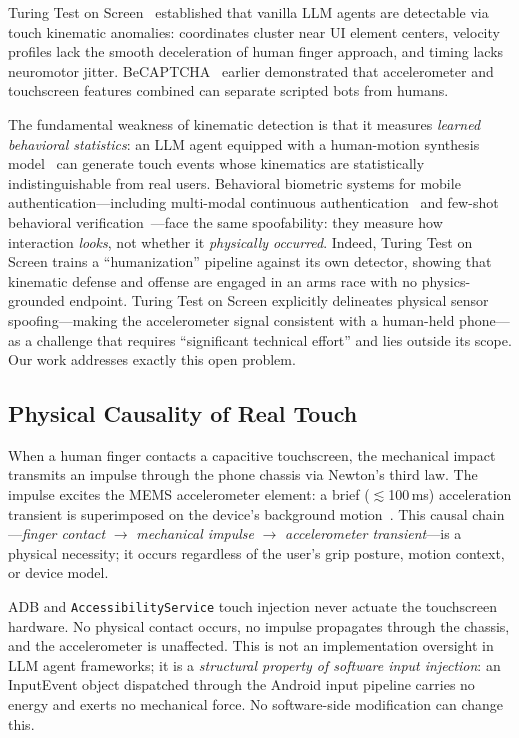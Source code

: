 Turing Test on Screen~\cite{ttos2026} established that vanilla LLM agents are detectable
via touch kinematic anomalies: coordinates cluster near UI element centers, velocity
profiles lack the smooth deceleration of human finger approach, and timing lacks
neuromotor jitter.%
BeCAPTCHA~\cite{becaptcha2021} earlier demonstrated that accelerometer and touchscreen
features combined can separate scripted bots from humans.%

The fundamental weakness of kinematic detection is that it measures \textit{learned
behavioral statistics}: an LLM agent equipped with a human-motion synthesis
model~\cite{swipegen2025} can generate touch events whose kinematics are
statistically indistinguishable from real users.%
Behavioral biometric systems for mobile authentication---including multi-modal
continuous authentication~\cite{mmauth2022} and few-shot behavioral verification~\cite{authentisense2023}---face
the same spoofability: they measure how interaction \textit{looks}, not whether it
\textit{physically occurred}.%
Indeed, Turing Test on Screen trains a ``humanization'' pipeline against its own detector,
showing that kinematic defense and offense are engaged in an arms race with no
physics-grounded endpoint.%
Turing Test on Screen explicitly delineates physical sensor spoofing---making the
accelerometer signal consistent with a human-held phone---as a challenge that requires
``significant technical effort'' and lies outside its scope.%
Our work addresses exactly this open problem.%

\subsection{Physical Causality of Real Touch}
\label{sec:bg_causality}

When a human finger contacts a capacitive touchscreen, the mechanical impact transmits
an impulse through the phone chassis via Newton's third law.%
The impulse excites the MEMS accelerometer element: a brief ($\lesssim$100\,ms) acceleration
transient is superimposed on the device's background motion~\cite{biomotouch2026}.%
This causal chain---\textit{finger contact} $\rightarrow$ \textit{mechanical impulse}
$\rightarrow$ \textit{accelerometer transient}---is a physical necessity; it occurs
regardless of the user's grip posture, motion context, or device model.%

ADB and \texttt{AccessibilityService} touch injection never actuate the touchscreen
hardware.%
No physical contact occurs, no impulse propagates through the chassis, and
the accelerometer is unaffected.%
This is not an implementation oversight in LLM agent frameworks; it is a
\textit{structural property of software input injection}: an InputEvent object
dispatched through the Android input pipeline carries no energy and exerts no
mechanical force.%
No software-side modification can change this.%

